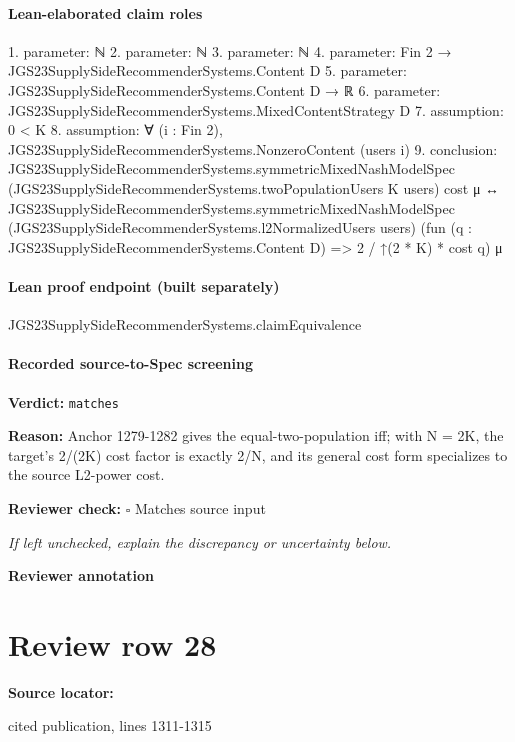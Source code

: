 \documentclass[10pt]{article}
\newcommand{\reviewerbox}{%
  \par\noindent\fbox{\parbox{0.96\linewidth}{\rule{0pt}{0.38in}}}\par
}
\newcommand{\reviewmatch}[1]{%
  \par\noindent\textbf{Reviewer check:} $\square$\; #1\par
  \noindent\emph{If left unchecked, explain the discrepancy or uncertainty below.}\par
}
\begin{document}
\paragraph{Lean-elaborated claim roles}\begin{ReviewVerbatim}
1. parameter: ℕ
2. parameter: ℕ
3. parameter: ℕ
4. parameter: Fin 2 → JGS23SupplySideRecommenderSystems.Content D
5. parameter: JGS23SupplySideRecommenderSystems.Content D → ℝ
6. parameter: JGS23SupplySideRecommenderSystems.MixedContentStrategy D
7. assumption: 0 < K
8. assumption: ∀ (i : Fin 2), JGS23SupplySideRecommenderSystems.NonzeroContent (users i)
9. conclusion: JGS23SupplySideRecommenderSystems.symmetricMixedNashModelSpec
    (JGS23SupplySideRecommenderSystems.twoPopulationUsers K users) cost μ ↔
  JGS23SupplySideRecommenderSystems.symmetricMixedNashModelSpec
    (JGS23SupplySideRecommenderSystems.l2NormalizedUsers users)
    (fun (q : JGS23SupplySideRecommenderSystems.Content D) => 2 / ↑(2 * K) * cost q) μ
\end{ReviewVerbatim}

\paragraph{Lean proof endpoint (built separately)}\begin{ReviewVerbatim}
JGS23SupplySideRecommenderSystems.claimEquivalence
\end{ReviewVerbatim}

\paragraph{Recorded source-to-Spec screening}
\textbf{Verdict:} \texttt{matches}
\\
{\raggedright
\textbf{Reason:} Anchor 1279-\allowbreak{}1282 gives the equal-\allowbreak{}two-\allowbreak{}population iff;\allowbreak{} with N = 2K, the target's 2/\allowbreak{}(2K) cost factor is exactly 2/\allowbreak{}N, and its general cost form specializes to the source L2-\allowbreak{}power cost.\allowbreak{}
\par}
\reviewmatch{Matches source input}
\noindent\textbf{Reviewer annotation}\par
\reviewerbox
\clearpage
\hypertarget{source-claim-9a018edf30caf4d9}{}
\section*{Review row 28}
\textbf{Source locator:} {\footnotesize\raggedright cited publication, lines 1311-\allowbreak{}1315\par}
\end{document}
